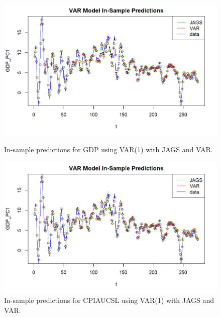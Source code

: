 \begin{figure}[H]
    \centering
    \begin{minipage}{0.49\textwidth}
        \centering
        \includegraphics[width=\textwidth]{images/6-VAR/VAR_predictions_gdp.png}
        \caption{In-sample predictions for GDP using VAR(1) with JAGS and VAR.}
        \label{fig:VAR_gdp_prediction}
    \end{minipage}\hfill
    \begin{minipage}{0.49\textwidth}
        \centering
        \includegraphics[width=\textwidth]{images/6-VAR/VAR_predictions_gdp.png}
        \caption{In-sample predictions for CPIAUCSL using VAR(1) with JAGS and VAR.}
        \label{fig:VAR_infl_prediction}
    \end{minipage}
\end{figure}
